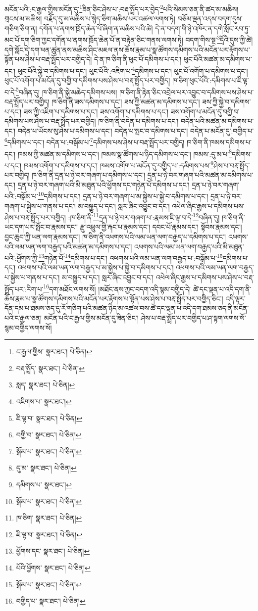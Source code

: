 མངོན་པའི་:ང་རྒྱལ་གྱིས་མངོན་དུ་\footnote{ང་རྒྱལ་གྱིས་  སྣར་ཐང་།  པེ་ཅིན། }ཟིན་ཅིང་ཤེས་པ་:བརྡ་སྤྲོད་པར་བྱེད་\footnote{བརྡ་སྤྲོད་  སྣར་ཐང་།  པེ་ཅིན། }པའི་སེམས་ཅན་ནི་ཚད་མ་མཆིས། གྲངས་མ་མཆིས། བརྗོད་དུ་མ་མཆིས་པ་སྙེད་ཅིག་མཆིས་པར་འཚལ་ལགས་ཏེ། བཅོམ་ལྡན་འདས་བདག་དུས་གཅིག་ཅིག་ན། དགོན་པ་ནགས་ཁྲོད་ཆེན་པོ་ཞིག་ན་མཆིས་པའི་ཚེ། དེ་ན་བདག་གི་ཉེ་འཁོར་ན་དགེ་སློང་རབ་ཏུ་མང་པོ་དག་ཅིག་ཀྱང་དགོན་པ་ནགས་ཁྲོད་ཆེན་པོ་ན་བརྟེན་ཅིང་གནས་ལགས་ཏེ། བདག་གིས་སྔ་\footnote{སླད་  སྣར་ཐང་།  པེ་ཅིན། }དྲོའི་དུས་ཀྱི་ཚེ། དགེ་སློང་དེ་དག་ཕན་ཚུན་ནས་མཆིས་ཤིང་མཇལ་ནས་ཆོས་རྣམ་པ་སྣ་ཚོགས་དམིགས་པའི་མངོན་པར་རྟོགས་པ་སྟོན་པས་ཤེས་པ་བརྡ་སྤྲོད་པར་བགྱིད་དེ། དེ་ན་ཁ་ཅིག་ནི་ཕུང་པོ་དམིགས་པ་དང་། ཕུང་པོའི་མཚན་མ་དམིགས་པ་དང་། ཕུང་པོའི་སྐྱེ་བ་དམིགས་པ་དང་། ཕུང་པོའི་:འཇིག་པ་\footnote{འཇིགས་པ་  སྣར་ཐང་། }དམིགས་པ་དང་། ཕུང་པོ་འགོག་པ་དམིགས་པ་དང་། ཕུང་པོ་འགོག་པ་མངོན་དུ་བགྱི་བ་དམིགས་པས་ཤེས་པ་བརྡ་སྤྲོད་པར་བགྱིད། ཁ་ཅིག་ཕུང་པོའི་:དམིགས་པ་ཇི་ལྟ་བ་དེ་\footnote{ཇི་ལྟ་བ་  སྣར་ཐང་།  པེ་ཅིན། }བཞིན་དུ། ཁ་ཅིག་ནི་སྐྱེ་མཆེད་དམིགས་པས། ཁ་ཅིག་ནི་རྟེན་ཅིང་འབྲེལ་པར་འབྱུང་བ་དམིགས་པས་ཤེས་པ་བརྡ་སྤྲོད་པར་བགྱིད། ཁ་ཅིག་ནི་ཟས་དམིགས་པ་དང་། ཟས་ཀྱི་མཚན་མ་དམིགས་པ་དང་། ཟས་ཀྱི་སྐྱེ་བ་དམིགས་པ་དང་། ཟས་ཀྱི་འཇིག་པ་དམིགས་པ་དང་། ཟས་འགོག་པ་དམིགས་པ་དང་། ཟས་འགོག་པ་མངོན་དུ་བགྱི་བ་དམིགས་པས་ཤེས་པ་བརྡ་སྤྲོད་པར་བགྱིད། ཁ་ཅིག་ནི་བདེན་པ་དམིགས་པ་དང་། བདེན་པའི་མཚན་མ་དམིགས་པ་དང་། བདེན་པ་ཡོངས་སུ་ཤེས་པ་དམིགས་པ་དང་། བདེན་པ་སྤང་བ་དམིགས་པ་དང་། བདེན་པ་མངོན་དུ་:བགྱིད་པ་\footnote{བགྱི་བ་  སྣར་ཐང་།  པེ་ཅིན། }དམིགས་པ་དང་། བདེན་པ་:བསྒོམ་པ་\footnote{སྒོམ་པ་  སྣར་ཐང་།  པེ་ཅིན། }དམིགས་པས་ཤེས་པ་བརྡ་སྤྲོད་པར་བགྱིད། ཁ་ཅིག་ནི་ཁམས་དམིགས་པ་དང་། ཁམས་ཀྱི་མཚན་མ་དམིགས་པ་དང་། ཁམས་སྣ་ཚོགས་པ་ཉིད་དམིགས་པ་དང་། ཁམས་:དུ་མ་པ་\footnote{དུ་མ་  སྣར་ཐང་།  པེ་ཅིན། }དམིགས་པ་དང་། ཁམས་འགོག་པ་དམིགས་པ་དང་། ཁམས་འགོག་པ་མངོན་དུ་བགྱིད་པ་:དམིགས་པས་\footnote{དམིགས་པ་  སྣར་ཐང་། }ཤེས་པ་བརྡ་སྤྲོད་པར་བགྱིད། ཁ་ཅིག་ནི་དྲན་པ་ཉེ་བར་གཞག་པ་དམིགས་པ་དང་། དྲན་པ་ཉེ་བར་གཞག་པའི་མཚན་མ་དམིགས་པ་དང་། དྲན་པ་ཉེ་བར་གཞག་པའི་མི་མཐུན་པའི་ཕྱོགས་དང་གཉེན་པོ་དམིགས་པ་དང་། དྲན་པ་ཉེ་བར་གཞག་པའི་:བསྒོམ་པ་\footnote{སྒོམ་པ་  སྣར་ཐང་།  པེ་ཅིན། }དམིགས་པ་དང་། དྲན་པ་ཉེ་བར་གཞག་པ་མ་སྐྱེས་པ་སྐྱེ་བ་དམིགས་པ་དང་། དྲན་པ་ཉེ་བར་གཞག་པ་སྐྱེས་པ་གནས་པ་དང་། མ་བསྐྱུད་པ་དང་། སླར་ཞིང་འབྱུང་བ་དང་། འཕེལ་ཞིང་རྒྱས་པ་དམིགས་པས་ཤེས་པ་བརྡ་སྤྲོད་པར་བགྱིད། :ཁ་ཅིག་ནི་\footnote{ཁ་ཅིག་  སྣར་ཐང་།  པེ་ཅིན། }དྲན་པ་ཉེ་བར་གཞག་པ་:རྣམས་ཇི་ལྟ་བ་དེ་\footnote{ཇི་ལྟ་བ་  སྣར་ཐང་།  པེ་ཅིན། }བཞིན་དུ། ཁ་ཅིག་ནི་ཡང་དག་པར་སྤོང་བ་རྣམས་དང་། རྫུ་འཕྲུལ་གྱི་རྐང་པ་རྣམས་དང་། དབང་པོ་རྣམས་དང་། སྟོབས་རྣམས་དང་། བྱང་ཆུབ་ཀྱི་ཡན་ལག་རྣམས་དང་། ཁ་ཅིག་ནི་འཕགས་པའི་ལམ་ཡན་ལག་བརྒྱད་པ་དམིགས་པ་དང་། འཕགས་པའི་ལམ་ཡན་ལག་བརྒྱད་པའི་མཚན་མ་དམིགས་པ་དང་། འཕགས་པའི་ལམ་ཡན་ལག་བརྒྱད་པའི་མི་མཐུན་པའི་:ཕྱོགས་ཀྱི་\footnote{ཕྱོགས་དང་  སྣར་ཐང་།  པེ་ཅིན། }གཉེན་པོ་\footnote{པོའི་ཕྱོགས་  སྣར་ཐང་།  པེ་ཅིན། }དམིགས་པ་དང་། འཕགས་པའི་ལམ་ཡན་ལག་བརྒྱད་པ་:བསྒོམ་པ་\footnote{སྒོམ་པ་  སྣར་ཐང་།  པེ་ཅིན། }དམིགས་པ་དང་། འཕགས་པའི་ལམ་ཡན་ལག་བརྒྱད་པ་མ་སྐྱེས་པ་སྐྱེ་བ་དམིགས་པ་དང་། འཕགས་པའི་ལམ་ཡན་ལག་བརྒྱད་པ་སྐྱེས་པ་གནས་པ་དང་། མ་བསྐྱུད་པ་དང་། སླར་ཞིང་འབྱུང་བ་དང་། འཕེལ་ཞིང་རྒྱས་པ་དམིགས་པས་ཤེས་པ་བརྡ་སྤྲོད་པར་:རིག་པ་\footnote{བགྱིད་པ་  སྣར་ཐང་།  པེ་ཅིན། }དག་མཐོང་ལགས་སོ། །མཐོང་ནས་ཀྱང་བདག་འདི་སྙམ་བགྱིད་དེ། ཚེ་དང་ལྡན་པ་འདི་དག་ནི་ཆོས་རྣམ་པ་སྣ་ཚོགས་དམིགས་པའི་མངོན་པར་རྟོགས་པ་སྟོན་པས་ཤེས་པ་བརྡ་སྤྲོད་པར་བགྱིད་ཅིང་། འདི་ལྟར་དོན་དམ་པ་ཐམས་ཅད་དུ་རོ་གཅིག་པའི་མཚན་ཉིད་མ་འཚལ་བས་ཚེ་དང་ལྡན་པ་འདི་དག་ཐམས་ཅད་ནི་མངོན་པའི་ང་རྒྱལ་ཅན། མངོན་པའི་ང་རྒྱལ་གྱིས་མངོན་དུ་ཟིན་ཅིང་། ཤེས་པ་བརྡ་སྤྲོད་པར་བགྱིད་པ་ཤ་སྟག་ལགས་སོ་སྙམ་བགྱིད་ལགས་སོ། 